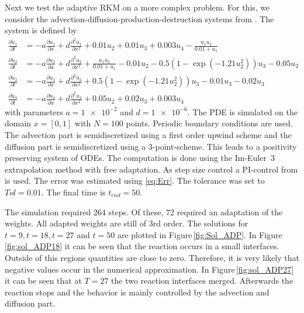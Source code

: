 \documentclass[a4paper]{article}
\numberwithin{equation}{section}
\theoremstyle{plain}
\theoremstyle{definition}
\numberwithin{theorem}{section}
\newcommand{\1}{\mathbbm{1}}
\begin{document}
Next we test the adaptive RKM on a more complex problem. 
For this, we consider the advection-diffusion-production-destruction systems from \cite{kopecz_comparison_2019}. The system is defined by
\begin{subequations}
\label{eq:ADR}
\begin{align}
\frac{\partial u_1}{\partial t} &=-a \frac{\partial u_1}{\partial x} + d\frac{\partial^2 u_1}{\partial x ^2} + 0.01u_2 + 0.01 u_3 +0.003u_4 - \frac{u_1 u_2}{0.01+u_1} \\ 
\frac{\partial u_2}{\partial t} &=-a \frac{\partial u_2}{\partial x} + d\frac{\partial^2 u_2}{\partial x ^2} + \frac{u_1u_2}{0.01+u_1} -0.01 u_2-0.5(1-\exp(-1.21 u_2^2)) u_3 -0.05 u_2 \\ 
\frac{\partial u_3}{\partial t} &=-a \frac{\partial u_3}{\partial x} + d\frac{\partial^2 u_3}{\partial x ^2} + 0.5(1-\exp(-1.21u_2^2)) u_3 - 0.01 u_3 -0.02 u_3 \\ 
\frac{\partial u_4}{\partial t} &=-a \frac{\partial u_4}{\partial x} + d\frac{\partial^2 u_4}{\partial x ^2} + 0.05 u_2 + 0.02 u_3 + 0.003u_4 
\end{align}
\end{subequations}
with parameters $a=\num{1e-2} $ and $ d=\num{1e-6}$.
The PDE is simulated on the domain $x = [0,1]$ with $N=100$ points. Periodic boundary conditions are used. 
The advection part is semidiscretized using a first order upwind scheme and the diffusion part is semidiscretized using a 3-point-scheme. This leads to a positivity preserving system of ODEs.
The computation is done using the Im-Euler~3 extrapolation
method with free adaptation.
As step size control a PI-control from\,\cite{hairer_solving_1996} is used. The error was estimated using \eqref{eq:Err}. The tolerance was set to $Tol = 0.01$.
The final time is $t_{end} = 50$.

The simulation required 264 steps. Of these, 72 required an adaptation of the weights. 
All adapted weights are still of 3rd order.
The solutions for $t=9,t=18,t=27$ and $t=50$ are plotted in Figure\,\ref{fig:Sol_ADP}. 
In Figure\,\ref{fig:sol_ADP18} it can be seen that the reaction occurs in a small interfaces. 
Outside of this regions quantities are close to zero. Therefore, it is very likely that negative values occur in the numerical approximation.
In Figure\,\ref{fig:sol_ADP27} it can be seen that at $T=27$ the two reaction interfaces merged. Afterwards the reaction stops and the behavior is mainly controlled by the advection and diffusion part.  
\end{document}

